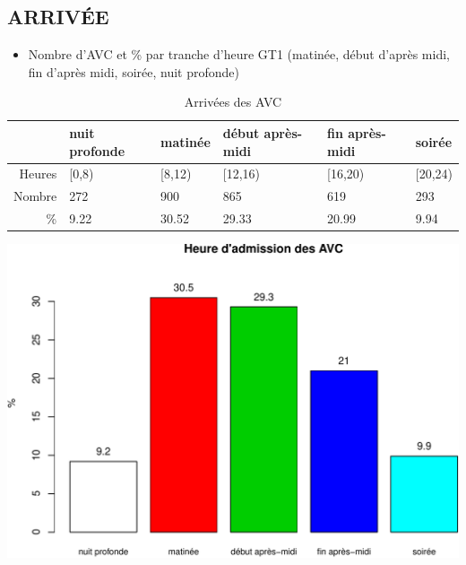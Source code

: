 \documentclass[]{article}
\begin{document}
\subsection{ARRIVÉE}\label{arrivee-2}

\begin{itemize}
\itemsep1pt\parskip0pt
\item
  Nombre d'AVC et \% par tranche d'heure GT1 (matinée, début d'après
  midi, fin d'après midi, soirée, nuit profonde)
\end{itemize}

\begin{table}[ht]
\centering
\begin{tabular}{rlllll}
  \hline
 & nuit profonde & matinée & début après-midi & fin après-midi & soirée \\ 
  \hline
Heures & [0,8) & [8,12) & [12,16) & [16,20) & [20,24) \\ 
  Nombre & 272 & 900 & 865 & 619 & 293 \\ 
  \% & 9.22 & 30.52 & 29.33 & 20.99 & 9.94 \\ 
   \hline
\end{tabular}
\caption{Arrivées des AVC} 
\label{avc.arrive}
\end{table}

\includegraphics{rapport2014_V4_files/figure-latex/avc_periode-1.pdf}
\end{document}
